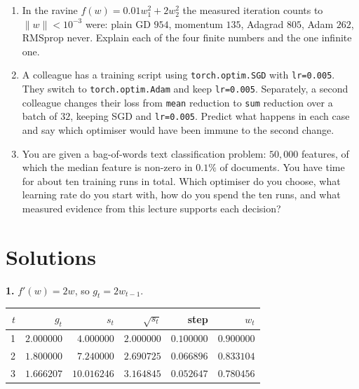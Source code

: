 \documentclass[11pt]{article}
\begin{document}
\begin{enumerate}[leftmargin=*]
  \item\label{q:ravine} In the ravine $f(w) = 0.01w_1^2 + 2w_2^2$ the measured
    iteration counts to $\lVert w\rVert < 10^{-3}$ were: plain GD $954$,
    momentum $135$, Adagrad $805$, Adam $262$, RMSprop never. Explain each of
    the four finite numbers and the one infinite one.

  \item\label{q:debug} A colleague has a training script using
    \texttt{torch.optim.SGD} with \texttt{lr=0.005}. They switch to
    \texttt{torch.optim.Adam} and keep \texttt{lr=0.005}. Separately, a second
    colleague changes their loss from \texttt{mean} reduction to \texttt{sum}
    reduction over a batch of $32$, keeping SGD and \texttt{lr=0.005}. Predict
    what happens in each case and say which optimiser would have been immune to
    the second change.

  \item\label{q:choose} You are given a bag-of-words text classification
    problem: $50{,}000$ features, of which the median feature is non-zero in
    $0.1\%$ of documents. You have time for about ten training runs in total.
    Which optimiser do you choose, what learning rate do you start with, how do
    you spend the ten runs, and what measured evidence from this lecture
    supports each decision?
\end{enumerate}

\newpage
\section{Solutions}
\label{sec:solutions}

\textbf{1.} $f'(w) = 2w$, so $g_t = 2w_{t-1}$.

\begin{center}
\begin{tabular}{@{}rrrrrr@{}}
\toprule
$t$ & $g_t$ & $s_t$ & $\sqrt{s_t}$ & step & $w_t$\\
\midrule
1 & $2.000000$ & $4.000000$  & $2.000000$ & $0.100000$ & $0.900000$\\
2 & $1.800000$ & $7.240000$  & $2.690725$ & $0.066896$ & $0.833104$\\
3 & $1.666207$ & $10.016246$ & $3.164845$ & $0.052647$ & $0.780456$\\
\bottomrule
\end{tabular}
\end{center}
\end{document}
